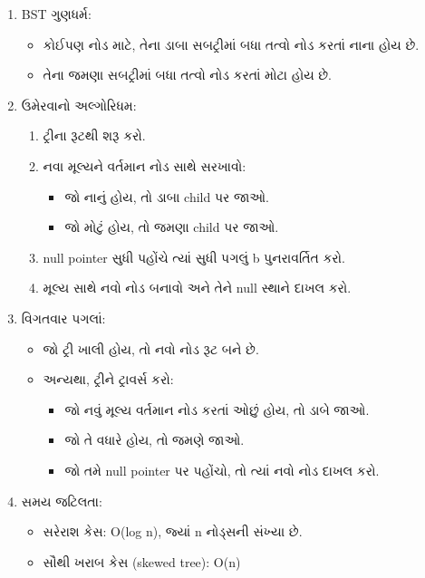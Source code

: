 \begin{enumerate}
\def\labelenumi{\arabic{enumi}.}
\tightlist
\item
  BST ગુણધર્મ:

  \begin{itemize}
  \tightlist
  \item
    કોઈપણ નોડ માટે, તેના ડાબા સબટ્રીમાં બધા તત્વો નોડ કરતાં નાના હોય છે.
  \item
    તેના જમણા સબટ્રીમાં બધા તત્વો નોડ કરતાં મોટા હોય છે.
  \end{itemize}
\item
  ઉમેરવાનો અલ્ગોરિધમ:

  \begin{enumerate}
  \def\labelenumii{\alph{enumii}.}
  \tightlist
  \item
    ટ્રીના રૂટથી શરૂ કરો.
  \item
    નવા મૂલ્યને વર્તમાન નોડ સાથે સરખાવો:

    \begin{itemize}
    \tightlist
    \item
      જો નાનું હોય, તો ડાબા child પર જાઓ.
    \item
      જો મોટું હોય, તો જમણા child પર જાઓ.
    \end{itemize}
  \item
    null pointer સુધી પહોંચે ત્યાં સુધી પગલું b પુનરાવર્તિત કરો.
  \item
    મૂલ્ય સાથે નવો નોડ બનાવો અને તેને null સ્થાને દાખલ કરો.
  \end{enumerate}
\item
  વિગતવાર પગલાં:

  \begin{itemize}
  \tightlist
  \item
    જો ટ્રી ખાલી હોય, તો નવો નોડ રૂટ બને છે.
  \item
    અન્યથા, ટ્રીને ટ્રાવર્સ કરો:

    \begin{itemize}
    \tightlist
    \item
      જો નવું મૂલ્ય વર્તમાન નોડ કરતાં ઓછું હોય, તો ડાબે જાઓ.
    \item
      જો તે વધારે હોય, તો જમણે જાઓ.
    \item
      જો તમે null pointer પર પહોંચો, તો ત્યાં નવો નોડ દાખલ કરો.
    \end{itemize}
  \end{itemize}
\item
  સમય જટિલતા:

  \begin{itemize}
  \tightlist
  \item
    સરેરાશ કેસ: O(log n), જ્યાં n નોડ્સની સંખ્યા છે.
  \item
    સૌથી ખરાબ કેસ (skewed tree): O(n)
  \end{itemize}
\end{enumerate}

